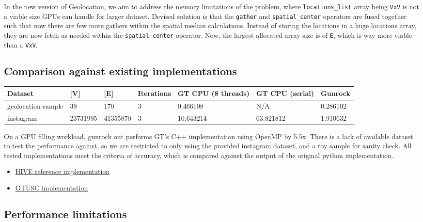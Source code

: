 \documentclass[10pt,article,oneside]{memoir}
\begin{document}
In the new version of Geolocation, we aim to address the memory
limitations of the problem, where \texttt{locations\_list} array being
\texttt{\textbar{}V\textbar{}x\textbar{}V\textbar{}} is not a viable
size GPUs can handle for larger dataset. Devised solution is that the
\texttt{gather} and \texttt{spatial\_center} operators are fused
together such that now there are few more gathers within the spatial
median calculations. Instead of storing the locations in a huge
locations array, they are now fetch as needed within the
\texttt{spatial\_center} operator. Now, the largest allocated array size
is of \texttt{\textbar{}E\textbar{}}, which is way more viable than a
\texttt{\textbar{}V\textbar{}x\textbar{}V\textbar{}}.

\subsection{Comparison against existing
implementations}\label{comparison-against-existing-implementations}

\begin{longtable}[c]{@{}lllllll@{}}
\toprule
Dataset & {[}V{]} & {[}E{]} & Iterations & GT CPU (8 threads) & GT CPU
(serial) & Gunrock\tabularnewline
\midrule
\endhead
geolocation-sample & 39 & 170 & 3 & 0.466108 & N/A &
0.286102\tabularnewline
instagram & 23731995 & 41355870 & 3 & 10.643214 & 63.821812 &
1.910632\tabularnewline
\bottomrule
\end{longtable}

On a GPU filling workload, gunrock out performs GT's C++ implementation
using OpenMP by 5.5x. There is a lack of available dataset to test the
performance against, so we are restricted to only using the provided
instagram dataset, and a toy sample for sanity check. All tested
implementations meet the criteria of accuracy, which is compared against
the output of the original python implementation.

\begin{itemize}
\itemsep1pt\parskip0pt
\item
  \href{https://gitlab.hiveprogram.com/ggillary/geotagging.git}{HIVE
  reference implementation}
\item
  \href{https://gitlab.hiveprogram.com/gtusc/geotagging}{GTUSC
  implementation}
\end{itemize}

\subsection{Performance limitations}\label{performance-limitations}
\end{document}
